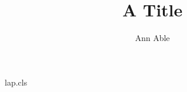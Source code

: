 \begin{filecontents*}[overwrite]{lap.cls}
\def\email#1{\par{\ttfamily #1}\par\@ifstar{starred}{}}
\def\address#1{\par{\itshape #1}\par\futurelet\next\@chk}
\def\@chk{\ifx\next.(dot)\fi}
\def\affil#1{\par{\bfseries #1}\par\@ifnextchar[{\@affopt}{}}
\def\@affopt[#1]{<#1>}
\def\institute#1{\par{\small #1}\par\ignorespaces}
\end{filecontents*}
\documentclass{lap}

\title{A Title}
\author{Ann Able}
\maketitle
Contact * now, \address{Lab A}. then [note] end    x.

\section{Intro}
Body.

